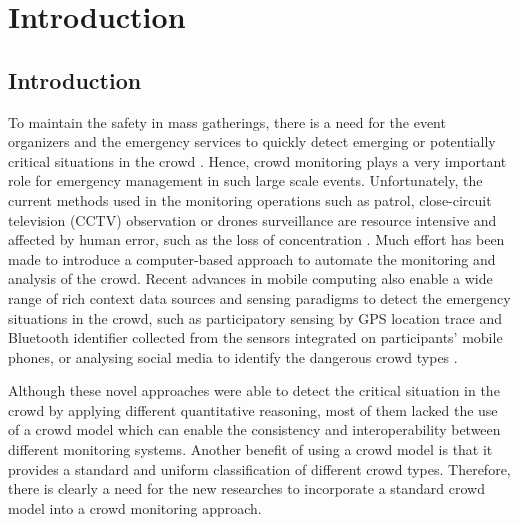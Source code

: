 \chapter{Introduction}  %
\label{ch:intro}
\ifpdf
    \graphicspath{{Chapter1/Figs/Raster/}{Chapter1/Figs/PDF/}{Chapter1/Figs/}}
\else
    \graphicspath{{Chapter1/Figs/Vector/}{Chapter1/Figs/}}
\fi

\section{Introduction}

To maintain the safety in mass gatherings, there is a need for the event organizers and the emergency services to quickly detect emerging or potentially critical situations in the crowd \citep{Wirz2012} . Hence, crowd monitoring plays a very important role for emergency management in such large scale events. Unfortunately, the current methods used in the monitoring operations such as patrol, close-circuit television (CCTV) observation or drones surveillance are resource intensive and affected by human error, such as the loss of concentration \citep{Davies1995}. Much effort has been made to introduce a computer-based approach to automate the monitoring and analysis of the crowd. Recent advances in mobile computing also enable a wide range of rich context data sources and sensing paradigms to detect the emergency situations in the crowd, such as participatory sensing by GPS location trace \citep{Wirz2012} and Bluetooth identifier \citep{Weppner2013} collected from the sensors integrated on participants' mobile phones, or analysing social media to identify the dangerous crowd types \citep{DelirHaghighi2013}.

Although these novel approaches were able to detect the critical situation in the crowd by applying different quantitative reasoning, most of them lacked the use of a crowd model which can enable the consistency and interoperability between different monitoring systems. Another benefit of using a crowd model is that it provides a standard and uniform classification of different crowd types. Therefore, there is clearly a need for the new researches to incorporate a standard crowd model into a crowd monitoring approach.


